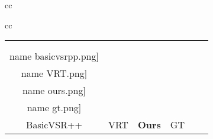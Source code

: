 \documentclass[10pt,twocolumn,letterpaper]{article}
\newcommand{\name}{0}
\newcommand{\h}{0}
\newcommand{\w}{0.15}
\newlength \g
\begin{document}
\begin{figure*}[t!]
{\begin{tabular}{cc}
\begin{tabular}{cc}
\begin{adjustbox}{valign=t}
\begin{tabular}{cccccc}
						\\
						\vspace{-2mm}
						\\
						\texttt{[image: \\name basicvsrpp.png]} \hspace{\g} &
						\texttt{[image: \\name VRT.png]} \hspace{\g} &
						\texttt{[image: \\name ours.png]}
						\hspace{\g} &		
						\texttt{[image: \\name gt.png]}
						\\ 
						BasicVSR++ \cite{chan2021basicvsrpp} \hspace{\g} &	VRT \cite{liang2022vrt} \hspace{\g} &
						\textbf{Ours} &
						GT
						\\
					\end{tabular}
				\end{adjustbox}
			\end{tabular}
			

\end{tabular}}
\end{figure*}
\end{document}
